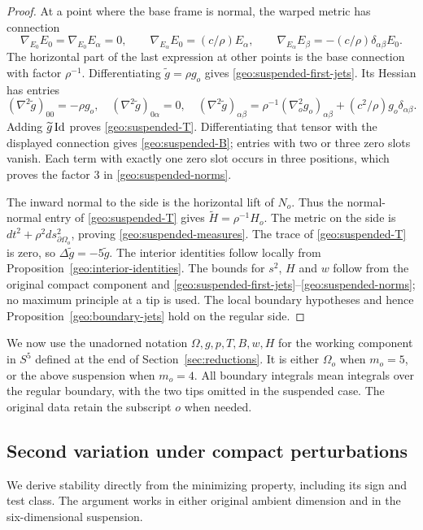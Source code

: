 \begin{proof}
At a point where the base frame is normal, the warped metric has
connection
\[
 \nabla_{E_0}E_0=\nabla_{E_0}E_\alpha=0,\qquad
 \nabla_{E_\alpha}E_0=(c/\rho)E_\alpha,\qquad
 \nabla_{E_\alpha}E_\beta=-(c/\rho)\delta_{\alpha\beta}E_0.
\]
The horizontal part of the last expression at other points is the
base connection with factor $\rho^{-1}$.
Differentiating $\widetilde g=\rho g_o$ gives
\eqref{geo:suspended-first-jets}. Its Hessian has entries
\[
 (\nabla^2\widetilde g)_{00}=-\rho g_o,
 \quad (\nabla^2\widetilde g)_{0\alpha}=0,
 \quad (\nabla^2\widetilde g)_{\alpha\beta}
 =\rho^{-1}(\nabla_o^2 g_o)_{\alpha\beta}
   +(c^2/\rho)g_o\delta_{\alpha\beta}.
\]
Adding $\widetilde g\operatorname{Id}$ proves \eqref{geo:suspended-T}.
Differentiating that tensor with the displayed connection gives
\eqref{geo:suspended-B}; entries with two or three zero slots vanish.
Each term with exactly one zero slot occurs in three positions,
which proves the factor $3$ in \eqref{geo:suspended-norms}.

The inward normal to the side is the horizontal lift of $N_o$.
Thus the normal-normal entry of \eqref{geo:suspended-T} gives
$\widetilde H=\rho^{-1}H_o$.
The metric on the side is $dt^2+\rho^2 ds_{\partial\Omega_o}^2$,
proving \eqref{geo:suspended-measures}.
The trace of \eqref{geo:suspended-T} is zero, so
$\Delta\widetilde g=-5\widetilde g$.
The interior identities follow locally from
Proposition~\ref{geo:interior-identities}.
The bounds for $s^2$, $H$ and $w$ follow from the original compact
component and \eqref{geo:suspended-first-jets}--\eqref{geo:suspended-norms};
no maximum principle at a tip is used. The local boundary hypotheses
and hence Proposition~\ref{geo:boundary-jets} hold on the regular side.
\end{proof}

We now use the unadorned notation $\Omega,g,p,T,B,w,H$ for the
working component in $S^5$ defined at the end of
Section~\ref{sec:reductions}. It is either
$\Omega_o$ when $m_o=5$, or the above suspension when $m_o=4$.
All boundary integrals mean integrals over the regular boundary, with
the two tips omitted in the suspended case. The original data retain
the subscript $o$ when needed.

\subsection{Second variation under compact perturbations}

We derive stability directly from the minimizing property, including
its sign and test class. The argument works in either original
ambient dimension and in the six-dimensional suspension.

